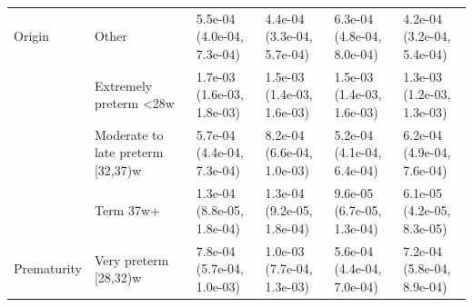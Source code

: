 \documentclass[smallextended]{svjour3} %
\begin{document}
\begin{landscape}
\begin{table}[t]
\begin{tabular}{llllll}
\multirow{-4}{*}{\raggedright\arraybackslash Origin} & Other & 5.5e-04 (4.0e-04, 7.3e-04) & 4.4e-04 (3.3e-04, 5.7e-04) & 6.3e-04 (4.8e-04, 8.0e-04) & 4.2e-04 (3.2e-04, 5.4e-04)\\
\cmidrule{1-6}
 & Extremely preterm <28w & 1.7e-03 (1.6e-03, 1.8e-03) & 1.5e-03 (1.4e-03, 1.6e-03) & 1.5e-03 (1.4e-03, 1.6e-03) & 1.3e-03 (1.2e-03, 1.3e-03)\\

 & Moderate to late preterm [32,37)w & 5.7e-04 (4.4e-04, 7.3e-04) & 8.2e-04 (6.6e-04, 1.0e-03) & 5.2e-04 (4.1e-04, 6.4e-04) & 6.2e-04 (4.9e-04, 7.6e-04)\\

 & Term 37w+ & 1.3e-04 (8.8e-05, 1.8e-04) & 1.3e-04 (9.2e-05, 1.8e-04) & 9.6e-05 (6.7e-05, 1.3e-04) & 6.1e-05 (4.2e-05, 8.3e-05)\\

\multirow{-4}{*}{\raggedright\arraybackslash Prematurity} & Very preterm [28,32)w & 7.8e-04 (5.7e-04, 1.0e-03) & 1.0e-03 (7.7e-04, 1.3e-03) & 5.6e-04 (4.4e-04, 7.0e-04) & 7.2e-04 (5.8e-04, 8.9e-04)\\
\bottomrule
\end{tabular}
\end{table}
\end{landscape}

\clearpage


\end{document}
